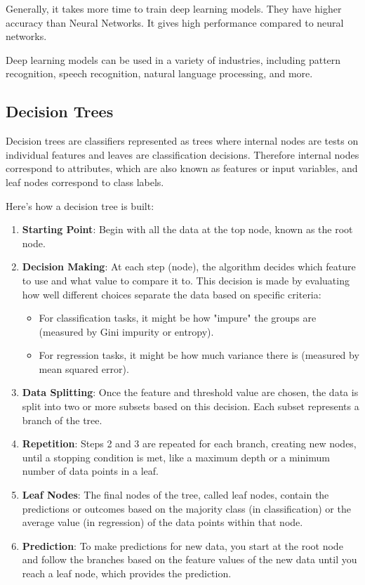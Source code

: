 Generally, it takes more time to train deep learning models. They have higher accuracy than Neural Networks. It gives high performance compared to neural networks.

Deep learning models can be used in a variety of industries, including pattern recognition, speech recognition, natural language processing, and more.


\subsection{Decision Trees} %
\label{sub: Decision_Trees}

Decision trees \cite{J_Ross_Quinlan1994} are classifiers represented as trees where internal nodes are tests on individual features and leaves are classification decisions. Therefore internal nodes correspond to attributes, which are also known as features or input variables, and leaf nodes correspond to class labels.


Here's how a decision tree is built:
\begin{enumerate}

 \item \textbf{Starting Point}: Begin with all the data at the top node, known as the root node.
 \item \textbf{Decision Making}: At each step (node), the algorithm decides which feature to use and what value to compare it to. This decision is made by evaluating how well different choices separate the data based on specific criteria:
 \begin{itemize}
 \item For classification tasks, it might be how "impure" the groups are (measured by Gini impurity or entropy).
 \item For regression tasks, it might be how much variance there is (measured by mean squared error).
 \end{itemize}
  \item \textbf{Data Splitting}: Once the feature and threshold value are chosen, the data is split into two or more subsets based on this decision. Each subset represents a branch of the tree.
 \item \textbf{Repetition}: Steps 2 and 3 are repeated for each branch, creating new nodes, until a stopping condition is met, like a maximum depth or a minimum number of data points in a leaf.
 \item \textbf{Leaf Nodes}: The final nodes of the tree, called leaf nodes, contain the predictions or outcomes based on the majority class (in classification) or the average value (in regression) of the data points within that node.
 \item \textbf{Prediction}: To make predictions for new data, you start at the root node and follow the branches based on the feature values of the new data until you reach a leaf node, which provides the prediction.
\end{enumerate}

